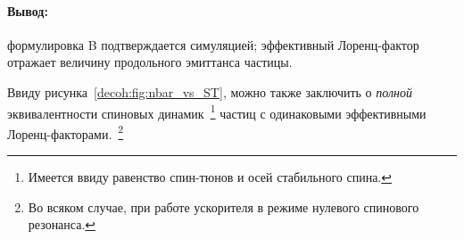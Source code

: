 \paragraph{Вывод:} формулировка B подтверждается симуляцией; эффективный Лоренц-фактор отражает величину продольного эмиттанса частицы.

Ввиду рисунка~\ref{decoh:fig:nbar_vs_ST}, можно также заключить о \emph{полной} эквивалентности спиновых динамик~\footnote{Имеется ввиду равенство спин-тюнов и осей стабильного спина.} частиц с одинаковыми эффективными Лоренц-факторами.~\footnote{Во всяком случае, при работе ускорителя в режиме нулевого спинового резонанса.}
